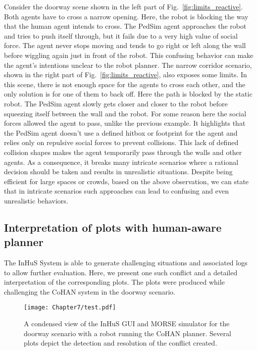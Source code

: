 Consider the doorway scene shown in the left part of Fig.~\ref{fig:limits_reactive}. Both agents have to cross a narrow opening. Here, the robot is blocking the way that the human agent intends to cross. The PedSim agent approaches the robot and tries to push itself through, but it fails due to a very high value of social force. The agent never stops moving and tends to go right or left along the wall before wiggling again just in front of the robot. 
This confusing behavior can make the agent's intentions unclear to the robot planner. 
The narrow corridor scenario, shown in the right part of Fig.~\ref{fig:limits_reactive}, also exposes some limits. In this scene, there is not enough space for the agents to cross each other,  and the only solution is for one of them to back off. Here the path is blocked by the static robot. The PedSim agent slowly gets closer and closer to the robot before squeezing itself between the wall and the robot. For some reason here the social forces allowed the agent to pass, unlike the previous example. It highlights that the PedSim agent doesn't use a defined hitbox or footprint for the agent and relies only on repulsive social forces to prevent collisions. This lack of defined collision shapes makes the agent temporarily pass through the walls and other agents. As a consequence, it breaks many intricate scenarios where a rational decision should be taken and results in unrealistic situations. Despite being efficient for large spaces or crowds, based on the above observation, we can state that in intricate scenarios such approaches can lead to confusing and even unrealistic behaviors.  

\subsection{Interpretation of plots with human-aware planner}

The InHuS System is able to generate challenging situations 
and associated logs to allow further evaluation.
Here, we present one such conflict and a detailed interpretation of the corresponding plots. The plots were produced while challenging the CoHAN system in the doorway scenario.

\begin{figure}
    \centering
    \texttt{[image: Chapter7/test.pdf]}
    
    \caption{
    A condensed view of the InHuS GUI and MORSE simulator for the doorway scenario with a robot running the CoHAN planner. Several plots depict the detection and resolution of the conflict created. 
    }
    \label{fig:cohan_passage_block}
    \vspace{-0.3cm}
\end{figure}


